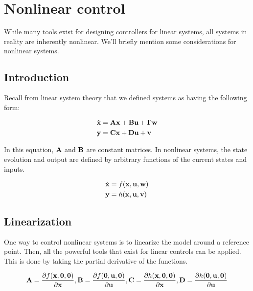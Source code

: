 \chapter{Nonlinear control} \label{ch:nonlinear-control}

While many tools exist for designing controllers for linear systems, all systems
in reality are inherently nonlinear. We'll briefly mention some considerations
for nonlinear systems.

\section{Introduction}

Recall from linear system theory that we defined systems as having the following
form:

\begin{align*}
  \dot{\mathbf{x}} &= \mathbf{A}\mathbf{x} + \mathbf{B}\mathbf{u} + \mathbf{\Gamma}\mathbf{w} \\
  \mathbf{y} &= \mathbf{C}\mathbf{x} + \mathbf{D}\mathbf{u} + \mathbf{v}
\end{align*}

In this equation, $\mathbf{A}$ and $\mathbf{B}$ are constant matrices. In nonlinear
systems, the state evolution and output are defined by arbitrary functions of
the current states and inputs.

\begin{align*}
  \dot{\mathbf{x}} &= f(\mathbf{x}, \mathbf{u}, \mathbf{w}) \\
  \mathbf{y} &= h(\mathbf{x}, \mathbf{u}, \mathbf{v})
\end{align*}

\section{Linearization}

One way to control nonlinear systems is to linearize the model around a
reference point. Then, all the powerful tools that exist for linear controls can
be applied. This is done by taking the partial derivative of the functions.

\begin{align*}
  \mathbf{A} = \frac{\partial f(\mathbf{x}, \mathbf{0}, \mathbf{0})}{\partial \mathbf{x}},
  \mathbf{B} = \frac{\partial f(\mathbf{0}, \mathbf{u}, \mathbf{0})}{\partial \mathbf{u}},
  \mathbf{C} = \frac{\partial h(\mathbf{x}, \mathbf{0}, \mathbf{0})}{\partial \mathbf{x}},
  \mathbf{D} = \frac{\partial h(\mathbf{0}, \mathbf{u}, \mathbf{0})}{\partial \mathbf{u}}
\end{align*}

